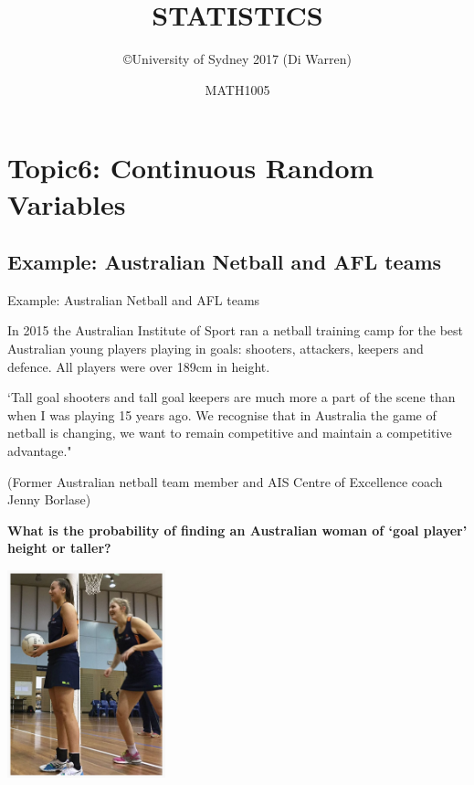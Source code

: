 \documentclass[t,xcolor=pdftex,dvipsnames,table]{beamer}
\title{\Huge STATISTICS}
\subtitle{}
\author{\copyright University of Sydney 2017 (Di Warren)}
\date{MATH1005}
\begin{document}
\section[6]{Topic6: Continuous Random Variables}
\subsection[Example]{Example: Australian Netball and AFL teams}
\begin{frame}{Example: Australian Netball and AFL teams}

In 2015 the Australian Institute of Sport ran a netball training camp for the best Australian young players playing in goals: shooters, attackers, keepers and defence. All players were over 189cm in height.  

\vspace{.5cm}
`Tall goal shooters and tall goal keepers are much more a part of the scene than when I was playing 15 years ago. We recognise that in Australia the game of netball is changing, we want to remain competitive and maintain a competitive advantage."

(Former Australian netball team member and AIS Centre of Excellence coach Jenny Borlase)
\href{http://www.abc.net.au/news/2015-06-14/tall-athletes-get-support-at-ais-to-stand-as-proud-netballers/6544642}{}
\end{frame}



\begin{frame}{}

{\bf What is the probability of finding an Australian woman of `goal player' height or taller?}

\begin{center}
\includegraphics[height=6cm]{../images/NetballHeight.jpg}
\end{center}

\end{frame}
\end{document}
